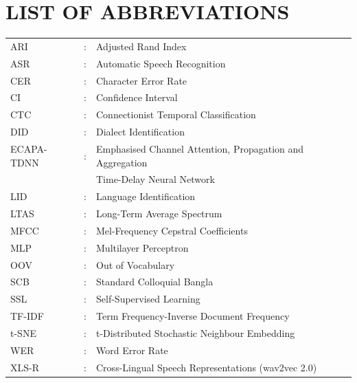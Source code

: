 \chapter*{LIST OF ABBREVIATIONS}

\begin{tabular}{@{}l@{\hspace{1em}}c@{\hspace{1em}}l@{}}
  ARI        & : & Adjusted Rand Index \\
  ASR        & : & Automatic Speech Recognition \\
  CER        & : & Character Error Rate \\
  CI         & : & Confidence Interval \\
  CTC        & : & Connectionist Temporal Classification \\
  DID        & : & Dialect Identification \\
  ECAPA-TDNN & : & Emphasised Channel Attention, Propagation and Aggregation \\
             &   & Time-Delay Neural Network \\
  LID        & : & Language Identification \\
  LTAS       & : & Long-Term Average Spectrum \\
  MFCC       & : & Mel-Frequency Cepstral Coefficients \\
  MLP        & : & Multilayer Perceptron \\
  OOV        & : & Out of Vocabulary \\
  SCB        & : & Standard Colloquial Bangla \\
  SSL        & : & Self-Supervised Learning \\
  TF-IDF     & : & Term Frequency-Inverse Document Frequency \\
  t-SNE      & : & t-Distributed Stochastic Neighbour Embedding \\
  WER        & : & Word Error Rate \\
  XLS-R      & : & Cross-Lingual Speech Representations (wav2vec 2.0) \\
\end{tabular}
